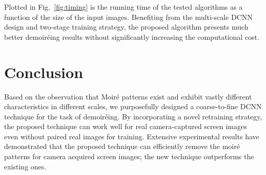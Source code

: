 \documentclass[10pt,twocolumn,letterpaper]{article}
\begin{document}
Plotted in Fig.~\ref{fig:timing} is the running time of the tested
algorithms as a function of the size of the input images.  Benefiting
from the multi-scale DCNN design and two-stage training strategy, the
proposed algorithm presents much better demoir\'eing results without
significantly increasing the computational cost.

\section{Conclusion}
\label{sec:conclusion}

Based on the observation that Moir\'e patterns exist and exhibit
vastly different characteristics in different scales, we purposefully
designed a coarse-to-fine DCNN technique for the task of demoir\'eing.
By incorporating a novel retraining strategy, the proposed technique
can work well for real camera-captured screen images even without
paired real images for training.  Extensive experimental results have
demonstrated that the proposed technique can efficiently remove the
moir\'e patterns for camera acquired screen images; the new technique
outperforms the existing ones.



\end{document}
